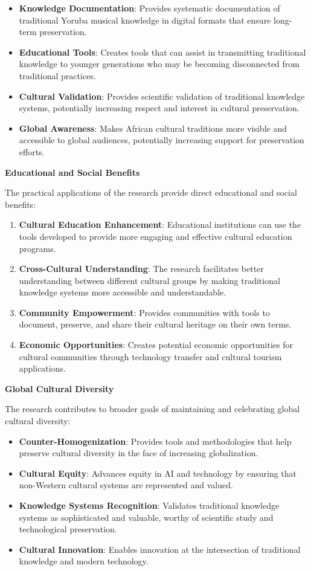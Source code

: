 \documentclass[12pt,a4paper]{article}
\begin{document}
\begin{itemize}
\item \textbf{Knowledge Documentation}: Provides systematic documentation of traditional Yoruba musical knowledge in digital formats that ensure long-term preservation.
\item \textbf{Educational Tools}: Creates tools that can assist in transmitting traditional knowledge to younger generations who may be becoming disconnected from traditional practices.
\item \textbf{Cultural Validation}: Provides scientific validation of traditional knowledge systems, potentially increasing respect and interest in cultural preservation.
\item \textbf{Global Awareness}: Makes African cultural traditions more visible and accessible to global audiences, potentially increasing support for preservation efforts.
\end{itemize}

\textbf{Educational and Social Benefits}

The practical applications of the research provide direct educational and social benefits:

\begin{enumerate}
\item \textbf{Cultural Education Enhancement}: Educational institutions can use the tools developed to provide more engaging and effective cultural education programs.
\item \textbf{Cross-Cultural Understanding}: The research facilitates better understanding between different cultural groups by making traditional knowledge systems more accessible and understandable.
\item \textbf{Community Empowerment}: Provides communities with tools to document, preserve, and share their cultural heritage on their own terms.
\item \textbf{Economic Opportunities}: Creates potential economic opportunities for cultural communities through technology transfer and cultural tourism applications.
\end{enumerate}

\textbf{Global Cultural Diversity}

The research contributes to broader goals of maintaining and celebrating global cultural diversity:

\begin{itemize}
\item \textbf{Counter-Homogenization}: Provides tools and methodologies that help preserve cultural diversity in the face of increasing globalization.
\item \textbf{Cultural Equity}: Advances equity in AI and technology by ensuring that non-Western cultural systems are represented and valued.
\item \textbf{Knowledge Systems Recognition}: Validates traditional knowledge systems as sophisticated and valuable, worthy of scientific study and technological preservation.
\item \textbf{Cultural Innovation}: Enables innovation at the intersection of traditional knowledge and modern technology.
\end{itemize}
\end{document}

